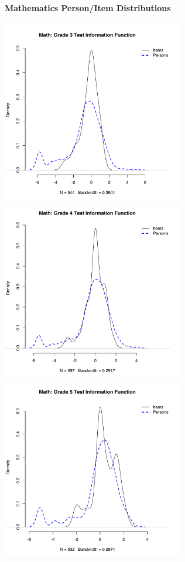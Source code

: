 \documentclass[]{article}
\let\oldparagraph\paragraph
\renewcommand{\paragraph}[1]{\oldparagraph{#1}\mbox{}}
\begin{document}
\paragraph{Mathematics Person/Item
Distributions}\label{mathematics-personitem-distributions}

\FloatBarrier
\includegraphics[height=3.12500in]{ipdens/math3ipdens.pdf}
\includegraphics[height=3.12500in]{ipdens/math4ipdens.pdf}
\includegraphics[height=3.12500in]{ipdens/math5ipdens.pdf}
\end{document}
